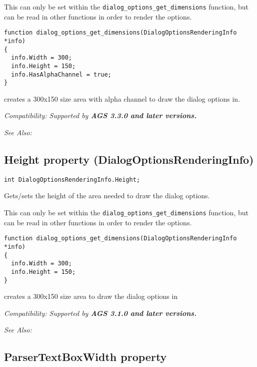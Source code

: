 This can only be set within the \verb$dialog_options_get_dimensions$ function, but
can be read in other functions in order to render the options.

\begin{verbatim}
function dialog_options_get_dimensions(DialogOptionsRenderingInfo *info)
{
  info.Width = 300;
  info.Height = 150;
  info.HasAlphaChannel = true;
}
\end{verbatim}
creates a 300x150 size area with alpha channel to draw the dialog options in.

\it{Compatibility:} Supported by \bf{AGS 3.3.0} and later versions.

\it{See Also:}


\subsection{Height property (DialogOptionsRenderingInfo)}\label{DialogOptionsRenderingInfo.Height}%

\begin{verbatim}
int DialogOptionsRenderingInfo.Height;
\end{verbatim}
Gets/sets the height of the area needed to draw the dialog options.

This can only be set within the \verb$dialog_options_get_dimensions$ function, but
can be read in other functions in order to render the options.

\begin{verbatim}
function dialog_options_get_dimensions(DialogOptionsRenderingInfo *info)
{
  info.Width = 300;
  info.Height = 150;
}
\end{verbatim}
creates a 300x150 size area to draw the dialog options in

\it{Compatibility:} Supported by \bf{AGS 3.1.0} and later versions.

\it{See Also:} 


\subsection{ParserTextBoxWidth property}\label{DialogOptionsRenderingInfo.ParserTextBoxWidth}%

